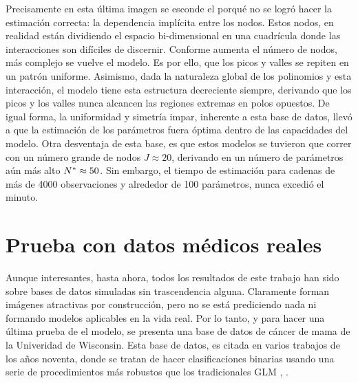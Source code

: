 \documentclass[../Main/Main.tex]{subfiles}
\begin{document}
Precisamente en esta última imagen se esconde el porqué no se logró hacer la estimación correcta: la dependencia implícita entre los nodos. Estos nodos, en realidad están dividiendo el espacio bi-dimensional en una cuadrícula donde las interacciones son difíciles de discernir. Conforme aumenta el número de nodos, más complejo se vuelve el modelo. Es por ello, que los picos y valles se repiten en un patrón uniforme. Asimismo, dada la naturaleza global de los polinomios y esta interacción, el modelo tiene esta estructura decreciente siempre, derivando que los picos y los valles nunca alcancen las regiones extremas en polos opuestos. De igual forma, la uniformidad y simetría impar, inherente a esta base de datos, llevó a que la estimación de los parámetros fuera óptima dentro de las capacidades del modelo. Otra desventaja de esta base, es que estos modelos se tuvieron que correr con un número grande de nodos $J \approx 20$, derivando en un número de parámetros aún más alto $N^* \approx 50$. Sin embargo, el tiempo de estimación para cadenas de más de 4000 observaciones y alrededor de 100 parámetros, nunca excedió el minuto. 

\section{Prueba con datos médicos reales}
Aunque interesantes, hasta ahora, todos los resultados de este trabajo han sido sobre bases de datos simuladas sin trascendencia alguna. Claramente forman imágenes atractivas por construcción, pero no se está prediciendo nada ni formando modelos aplicables en la vida real. Por lo tanto, y para hacer una última prueba de el modelo, se presenta una base de datos de cáncer de mama de la Univeridad de Wisconsin. Esta base de datos, es citada en varios trabajos de los años noventa, donde se tratan de hacer clasificaciones binarias usando una serie de procedimientos más robustos que los tradicionales GLM \autocite{mangasarian1990pattern}, \autocite{bennett1992robust}.
\end{document}
